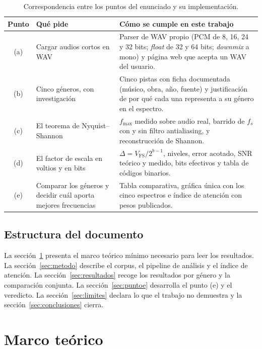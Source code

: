 \documentclass[11pt,a4paper]{article}
\newcommand{\fs}{f_s}
\newcommand{\fmax}{f_{\max}}
\newcommand{\Vfs}{V_{\mathrm{FS}}}
\newcommand{\dd}{\Delta}
\begin{document}
\begin{table}[H]
\centering
\small
\begin{tabularx}{\linewidth}{@{}c l >{\raggedright\arraybackslash}X@{}}
\toprule
\textbf{Punto} & \textbf{Qué pide} & \textbf{Cómo se cumple en este trabajo} \\
\midrule
(a) & Cargar audios cortos en WAV &
Parser de WAV propio (PCM de 8, 16, 24 y 32 bits; \textit{float} de 32 y 64
bits; \textit{downmix} a mono) y página web que acepta un WAV del usuario. \\
(b) & Cinco géneros, con investigación &
Cinco pistas con ficha documentada (músico, obra, año, fuente) y justificación
de por qué cada una representa a su género en el espectro. \\
(c) & El teorema de Nyquist--Shannon &
\(\fmax\) medido sobre audio real, barrido de \(\fs\) con y sin filtro
antialiasing, y reconstrucción de Shannon. \\
(d) & El factor de escala en voltios y en bits &
\(\dd = \Vfs/2^{b-1}\), niveles, error acotado, SNR teórico y medido, bits
efectivos y tabla de códigos binarios. \\
(e) & Comparar los géneros y decidir cuál aporta mejores frecuencias &
Tabla comparativa, gráfica única con los cinco espectros e índice de atención
con pesos publicados. \\
\bottomrule
\end{tabularx}
\caption{Correspondencia entre los puntos del enunciado y su implementación.}
\label{tab:puntos}
\end{table}

\subsection{Estructura del documento}

La sección~\ref{sec:teoria} presenta el marco teórico mínimo necesario para
leer los resultados. La sección~\ref{sec:metodo} describe el corpus, el
pipeline de análisis y el índice de atención. La
sección~\ref{sec:resultados} recoge los resultados por género y la comparación
conjunta. La sección~\ref{sec:puntoe} desarrolla el punto (e) y el veredicto.
La sección~\ref{sec:limites} declara lo que el trabajo no demuestra y la
sección~\ref{sec:conclusiones} cierra.

\section{Marco teórico}\label{sec:teoria}
\end{document}
